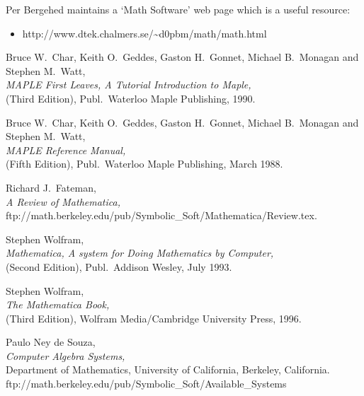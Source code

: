 Per Bergehed maintains a `Math Software' web page which is a useful
resource:

\begin{itemize}

\item {}
       {
       {http://www.dtek.chalmers.se/\~{}d0pbm/math/math.html}}

\end{itemize}

\begin{thebibliography}{99}

 Bruce W.~Char, Keith O.~Geddes, Gaston H.~Gonnet,
     Michael B.~Monagan and Stephen M.~Watt,\\
     {\sl MAPLE First Leaves, A Tutorial Introduction to Maple,}\\
     (Third Edition), Publ.~Waterloo Maple Publishing, 1990.

 Bruce W.~Char, Keith O.~Geddes, Gaston H.~Gonnet,
     Michael B.~Monagan and Stephen M.~Watt,\\
     {\sl MAPLE Reference Manual,}\\
     (Fifth Edition), Publ.~Waterloo Maple Publishing, March 1988.

 Richard J.~Fateman,\\
     {\sl A Review of Mathematica,}\\
     {ftp://math.berkeley.edu/pub/Symbolic_Soft/Mathematica/Review.tex}.

 Stephen Wolfram,\\
     {\sl Mathematica, A system for Doing Mathematics by Computer,}\\
     (Second Edition), Publ.~Addison Wesley, July 1993.

 Stephen Wolfram,\\
     {\sl The Mathematica Book,}\\
     (Third Edition), Wolfram Media/Cambridge University Press, 1996.

 Paulo Ney de Souza,\\
     {\sl Computer Algebra Systems,}\\
     Department of Mathematics, University of California, Berkeley,
     California.\\
     {ftp://math.berkeley.edu/pub/Symbolic_Soft/Available_Systems}

\end{thebibliography}


